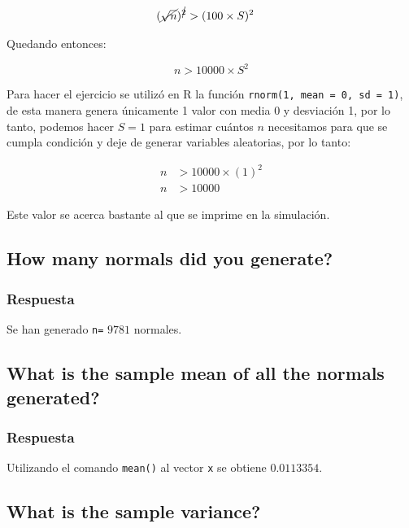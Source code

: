 \documentclass[12pt]{article}\usepackage[]{graphicx}\usepackage[]{xcolor}
\begin{document}
\begin{align*}
  (\cancel{\sqrt{n}})^{\cancel{2}} &> (100 \times S)^{2} 
\end{align*}

Quedando entonces:

\[
n > 10000\times S^{2}
\]

Para hacer el ejercicio se utilizó en \textsf{R} la función \texttt{rnorm(1, mean = 0, sd = 1)}, de esta manera genera únicamente 1 valor con media 0 y desviación 1, por lo tanto, podemos hacer $S = 1$ para estimar cuántos $n$ necesitamos para que se cumpla condición y deje de generar variables aleatorias, por lo tanto:

\begin{align*}
  n &> 10000 \times (1)^{2} \\
  n &> 10000 
\end{align*}

Este valor se acerca bastante al que se imprime en la simulación. 











\subsection{How many normals did you generate?}
\label{subsec:p1-b}

\subsubsection{Respuesta}

Se han generado \lstinline|n=| $9781$ normales.


\subsection{What is the sample mean of all the normals generated?}
\label{subsec:p1-c}




\subsubsection{Respuesta}

Utilizando el comando \lstinline|mean()| al vector \lstinline|x| se obtiene $0.0113354$. 

\subsection{What is the sample variance?}
\label{subsec:p1-d}
\end{document}
